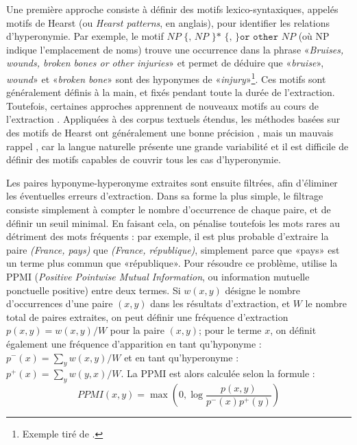 Une première approche consiste à définir des motifs lexico-syntaxiques, appelés motifs de Hearst \cite{hearst1992automatic} (ou \textit{Hearst patterns}, en anglais), pour identifier les relations d'hyperonymie. Par exemple, le motif $NP \texttt{ \{, } NP \texttt{ \}* \{, \} or other } NP$ (où NP indique l'emplacement de noms) trouve une occurrence dans la phrase «\textit{Bruises, wounds, broken bones or other injuries}» et permet de déduire que «\textit{bruise}», \textit{wound}» et «\textit{broken bone}» sont des hyponymes de «\textit{injury}»\footnote{Exemple tiré de \cite{hearst1992automatic}.}.
Ces motifs sont généralement définis à la main, et fixés pendant toute la durée de l'extraction. Toutefois, certaines approches apprennent de nouveaux motifs au cours de l'extraction \cite{snow2005learning, shwartz-etal-2016-improving}. Appliquées à des corpus textuels étendus, les méthodes basées sur des motifs de Hearst ont généralement une bonne précision \cite{roller-etal-2018-hearst}, mais un mauvais rappel \cite{wu2008automatically}, car la langue naturelle présente une grande variabilité et il est difficile de définir des motifs capables de couvrir tous les cas d'hyperonymie.

Les paires hyponyme-hyperonyme extraites sont ensuite filtrées, afin d'éliminer les éventuelles erreurs d'extraction. Dans sa forme la plus simple, le filtrage consiste simplement à compter le nombre d'occurrence de chaque paire, et de définir un seuil minimal. En faisant cela, on pénalise toutefois les mots rares au détriment des mots fréquents : par exemple, il est plus probable d'extraire la paire \textit{(France, pays)} que \textit{(France, république)}, simplement parce que «pays» est un terme plus commun que «république». Pour résoudre ce problème, \cite{turney2001mining} utilise la PPMI (\textit{Positive Pointwise Mutual Information}, ou information mutuelle ponctuelle positive) entre deux termes. Si $w(x, y)$ désigne le nombre d'occurrences d'une paire $(x, y)$ dans les résultats d'extraction, et $W$ le nombre total de paires extraites, on peut définir une fréquence d'extraction $p(x, y) = w(x,y) / W$ pour la paire $(x, y)$; pour le terme $x$, on définit également une fréquence d'apparition en tant qu'hyponyme : $p^-(x) = \sum_y w(x, y) / W$ et en tant qu'hyperonyme : $p^+(x) = \sum_y w(y, x) / W$. La PPMI est alors calculée selon la formule :
\begin{equation}
    PPMI(x, y) = \max \left(0, \log\frac{p(x, y)}{p^-(x)p^+(y)} \right)
\end{equation}

